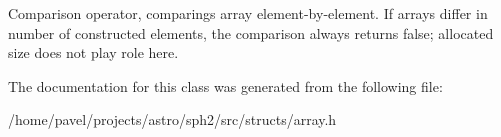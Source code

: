 Comparison operator, comparings array element-\/by-\/element. If arrays differ in number of constructed elements, the comparison always returns false; allocated size does not play role here. 

The documentation for this class was generated from the following file\+:\begin{DoxyCompactItemize}
\item 
/home/pavel/projects/astro/sph2/src/structs/array.\+h\end{DoxyCompactItemize}
